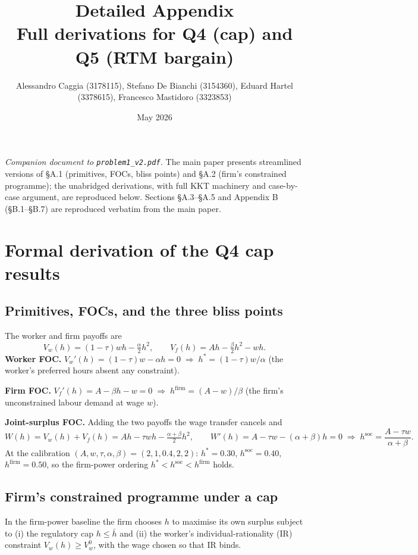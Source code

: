 \documentclass[a4paper,11pt]{article}
\title{Detailed Appendix\\[0.2em]\large Full derivations for Q4 (cap) and Q5 (RTM bargain)}
\author{Alessandro Caggia (3178115), Stefano De Bianchi (3154360), Eduard Hartel (3378615), Francesco Mastidoro (3323853)}
\date{May 2026}
\begin{document}
\maketitle

\noindent\emph{Companion document to \texttt{problem1\_v2.pdf}.} The main paper presents streamlined versions of \S A.1 (primitives, FOCs, bliss points) and \S A.2 (firm's constrained programme); the unabridged derivations, with full KKT machinery and case-by-case argument, are reproduced below. Sections \S A.3--\S A.5 and Appendix B (\S B.1--\S B.7) are reproduced verbatim from the main paper.

\section{Formal derivation of the Q4 cap results}

\subsection{Primitives, FOCs, and the three bliss points}
The worker and firm payoffs are
\[
V_w(h)=(1-\tau)wh-\tfrac{\alpha}{2}h^2,
\qquad
V_f(h)=Ah-\tfrac{\beta}{2}h^2-wh.
\]
\textbf{Worker FOC.} $V_w'(h)=(1-\tau)w-\alpha h=0\;\Longrightarrow\;h^{*}=(1-\tau)w/\alpha$ (the worker's preferred hours absent any constraint).

\textbf{Firm FOC.} $V_f'(h)=A-\beta h-w=0\;\Longrightarrow\;h^{\mathrm{firm}}=(A-w)/\beta$ (the firm's unconstrained labour demand at wage $w$).

\textbf{Joint-surplus FOC.} Adding the two payoffs the wage transfer cancels and
\[
W(h)=V_w(h)+V_f(h)=Ah-\tau wh-\tfrac{\alpha+\beta}{2}h^{2},\qquad W'(h)=A-\tau w-(\alpha+\beta)h=0\;\Longrightarrow\;h^{\mathrm{soc}}=\frac{A-\tau w}{\alpha+\beta}.
\]
At the calibration $(A,w,\tau,\alpha,\beta)=(2,1,0.4,2,2)$: $h^{*}=0.30$, $h^{\mathrm{soc}}=0.40$, $h^{\mathrm{firm}}=0.50$, so the firm-power ordering $h^{*}<h^{\mathrm{soc}}<h^{\mathrm{firm}}$ holds.

\subsection{Firm's constrained programme under a cap}
In the firm-power baseline the firm chooses $h$ to maximise its own surplus subject to (i) the regulatory cap $h\le\bar h$ and (ii) the worker's individual-rationality (IR) constraint $V_w(h)\ge V_w^{0}$, with the wage chosen so that IR binds.
\end{document}
